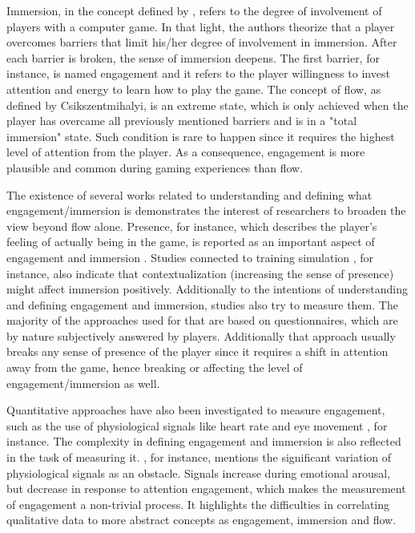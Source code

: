 Immersion, in the concept defined by \textcite{brown2004grounded}, refers to the degree of involvement of players with a computer game. In that light, the authors theorize that a player overcomes barriers that limit his/her degree of involvement in immersion. After each barrier is broken, the sense of immersion deepens. The first barrier, for instance, is named engagement and it refers to the player willingness to invest attention and energy to learn how to play the game. The concept of flow, as defined by Csikszentmihalyi, is an extreme state, which is only achieved when the player has overcame all previously mentioned barriers and is in a "total immersion" state. Such condition is rare to happen since it requires the highest level of attention from the player. As a consequence, engagement is more plausible and common during gaming experiences than flow.

The existence of several works \parencite{boyle2012engagement} related to understanding and defining what engagement/immersion is demonstrates the interest of researchers to broaden the view beyond flow alone. Presence, for instance, which describes the player's feeling of actually being in the game, is reported as an important aspect of engagement and immersion \parencite{weibel2011immersion}. Studies connected to training simulation \parencite{engstrom2016impact}, for instance, also indicate that contextualization (increasing the sense of presence) might affect immersion positively. Additionally to the intentions of understanding and defining engagement and immersion, studies also try to measure them. The majority of the approaches used for that are based on questionnaires, which are by nature subjectively answered by players. Additionally that approach usually breaks any sense of presence of the player since it requires a shift in attention away from the game, hence breaking or affecting the level of engagement/immersion as well.

Quantitative approaches have also been investigated to measure engagement, such as the use of physiological signals like heart rate \parencite{ravaja20051} and eye movement \parencite{jennett2008measuring}, for instance. The complexity in defining engagement and immersion is also reflected in the task of measuring it. \textcite{ravaja20051}, for instance, mentions the significant variation of physiological signals as an obstacle. Signals increase during emotional arousal, but decrease in response to attention engagement, which makes the measurement of engagement a non-trivial process. It highlights the difficulties in correlating qualitative data to more abstract concepts as engagement, immersion and flow.

